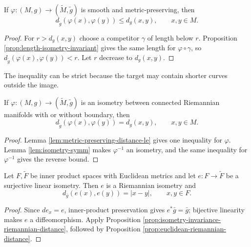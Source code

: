 \begin{lemma}
\label{lem:metric-preserving-distance-le}
\leanok
{}
If $\varphi:(M,g)\to(\widetilde M,\widetilde g)$ is smooth and metric-preserving, then
\[
d_{\widetilde g}(\varphi(x),\varphi(y))\le d_g(x,y),
\qquad x,y\in M.
\]
\end{lemma}
\begin{proof}
\leanok
{}
\sketch For $r>d_g(x,y)$ choose a competitor $\gamma$ of length below $r$. Proposition \ref{prop:length-isometry-invariant} gives the same length for $\varphi\circ\gamma$, so $d_{\widetilde g}(\varphi(x),\varphi(y))<r$. Let $r$ decrease to $d_g(x,y)$.
\end{proof}

The inequality can be strict because the target may contain shorter curves outside the image.

\begin{proposition}
\label{prop:isometry-invariance-riemannian-distance}
\leanok
{}
If $\varphi:(M,g)\to(\widetilde M,\widetilde g)$ is an isometry between connected Riemannian manifolds with or without boundary, then
\[
d_{\widetilde g}(\varphi(x),\varphi(y))=d_g(x,y),
\qquad x,y\in M.
\]
\end{proposition}
\begin{proof}
\leanok
{}
\sketch Lemma \ref{lem:metric-preserving-distance-le} gives one inequality for $\varphi$. Lemma \ref{lem:isometry-symm} makes $\varphi^{-1}$ an isometry, and the same inequality for $\varphi^{-1}$ gives the reverse bound.
\end{proof}

\begin{proposition}
\label{prop:euclidean-linear-isometry-distance}
\leanok
{}
Let $F,\widetilde F$ be inner product spaces with Euclidean metrics and let $e:F\to\widetilde F$ be a surjective linear isometry. Then $e$ is a Riemannian isometry and
\[
d_{\bar g}(e(x),e(y))=|x-y|,
\qquad x,y\in F.
\]
\end{proposition}
\begin{proof}
\leanok
{}
\sketch Since $de_x=e$, inner-product preservation gives $e^*\bar g=\bar g$; bijective linearity makes $e$ a diffeomorphism. Apply Proposition \ref{prop:isometry-invariance-riemannian-distance}, followed by Proposition \ref{prop:euclidean-riemannian-distance}.
\end{proof}

